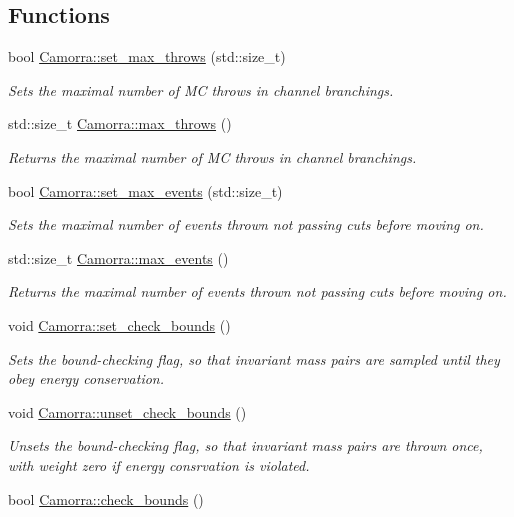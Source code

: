 \subsection*{Functions}
\begin{DoxyCompactItemize}
\item 
bool \hyperlink{a00831_a8e7abe7989872893e4658e836e705e8b}{Camorra::set\_\-max\_\-throws} (std::size\_\-t)
\begin{DoxyCompactList}\small\item\em Sets the maximal number of MC throws in channel branchings. \end{DoxyCompactList}\item 
\hypertarget{a00831_aad740b9c1b63bae05bde19fba7346083}{
std::size\_\-t \hyperlink{a00831_aad740b9c1b63bae05bde19fba7346083}{Camorra::max\_\-throws} ()}
\label{a00831_aad740b9c1b63bae05bde19fba7346083}

\begin{DoxyCompactList}\small\item\em Returns the maximal number of MC throws in channel branchings. \end{DoxyCompactList}\item 
bool \hyperlink{a00831_ae3b4057dc8cfd9c13e27baeb41fe2811}{Camorra::set\_\-max\_\-events} (std::size\_\-t)
\begin{DoxyCompactList}\small\item\em Sets the maximal number of events thrown not passing cuts before moving on. \end{DoxyCompactList}\item 
std::size\_\-t \hyperlink{a00831_a40ee4ceb5138dc297571023bd1a5914e}{Camorra::max\_\-events} ()
\begin{DoxyCompactList}\small\item\em Returns the maximal number of events thrown not passing cuts before moving on. \end{DoxyCompactList}\item 
void \hyperlink{a00831_ae5c24849230108835931bb0c65d46c71}{Camorra::set\_\-check\_\-bounds} ()
\begin{DoxyCompactList}\small\item\em Sets the bound-\/checking flag, so that invariant mass pairs are sampled until they obey energy conservation. \end{DoxyCompactList}\item 
void \hyperlink{a00831_a7b0e83f06ef665b4c5f83b491082d880}{Camorra::unset\_\-check\_\-bounds} ()
\begin{DoxyCompactList}\small\item\em Unsets the bound-\/checking flag, so that invariant mass pairs are thrown once, with weight zero if energy consrvation is violated. \end{DoxyCompactList}\item 
\hypertarget{a00831_a8a8aa03dda7935c5af2720097cdbc010}{
bool \hyperlink{a00831_a8a8aa03dda7935c5af2720097cdbc010}{Camorra::check\_\-bounds} ()}
\label{a00831_a8a8aa03dda7935c5af2720097cdbc010}


\end{DoxyCompactItemize}
